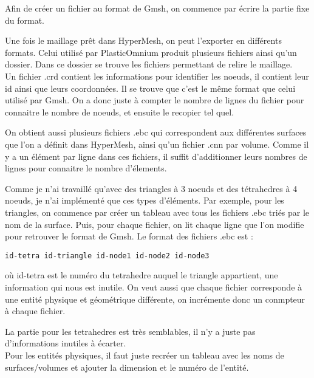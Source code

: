 Afin de créer un fichier au format de Gmsh, on commence par écrire la partie fixe du format. 


Une fois le maillage prêt dans HyperMesh, on peut l'exporter en différents formats. Celui utilisé par PlasticOmnium produit plusieurs fichiers ainsi qu'un dossier. Dans ce dossier se trouve les fichiers permettant de relire le maillage.\\ 
Un fichier .crd contient les informations pour identifier les noeuds, il contient leur id ainsi que leurs coordonnées. Il se trouve que c'est le même format que celui utilisé par Gmsh. On a donc juste à compter le nombre de lignes du fichier pour connaitre le nombre de noeuds, et ensuite le recopier tel quel.


On obtient aussi plusieurs fichiers .ebc qui correspondent aux différentes surfaces que l'on a définit dans HyperMesh, ainsi qu'un fichier .cnn par volume. Comme il y a un élément par ligne dans ces fichiers, il suffit d'additionner leurs nombres de lignes pour connaitre le nombre d'élements.


Comme je n'ai travaillé qu'avec des triangles à 3 noeuds et des tétrahedres à 4 noeuds, je n'ai implémenté que ces types d'éléments. Par exemple, pour les triangles, on commence par créer un tableau avec tous les fichiers .ebc triés par le nom de la surface. Puis, pour chaque fichier, on lit chaque ligne que l'on modifie pour retrouver le format de Gmsh. Le format des fichiers .ebc est :
\begin{verbatim}
id-tetra id-triangle id-node1 id-node2 id-node3
\end{verbatim}
où id-tetra est le numéro du tetrahedre auquel le triangle appartient, une information qui nous est inutile. On veut aussi que chaque fichier corresponde à une entité physique et géométrique différente, on incrémente donc un conmpteur à chaque fichier.


La partie pour les tetrahedres est très semblables, il n'y a juste pas d'informations inutiles à écarter.\\
Pour les entités physiques, il faut juste recréer un tableau avec les noms de surfaces/volumes et ajouter la dimension et le numéro de l'entité.


